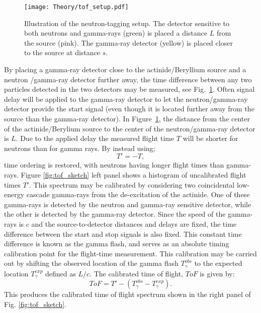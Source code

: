 \documentclass[main.tex]{subfiles}
\begin{document}
\begin{figure}[t]
    \centering
        \texttt{[image: Theory/tof\_setup.pdf]}
        \caption[Illustration of the neutron-tagging setup]{Illustration of the neutron-tagging setup. The detector sensitive to both neutrons and gamma-rays (green) is placed a distance $L$ from the source (pink). The gamma-ray detector (yellow) is placed closer to the source at distance $s$. }
    \label{fig:tof_setup} 
\end{figure}

By placing a gamma-ray detector close to the actinide/Beryllium source and a neutron /gamma-ray detector further away, the time difference between any two particles detected in the two detectors may be measured, see Fig.~\ref{fig:tof_setup}. Often signal delay will be applied to the gamma-ray detector to let the neutron/gamma-ray detector provide the start signal (even though it is located further away from the source than the gamma-ray detector).
In Figure~\ref{fig:tof_setup}, the distance from the center of the actinide/Berylium source to the center of the neutron/gamma-ray detector is $L$.  Due to the applied delay the measured flight time $T$ will be shorter for neutrons than for gamma rays. By instead using;
\begin{equation}
T'=-T,
\end{equation}
time ordering is restored, with neutrons having longer flight times than gamma-rays. Figure \ref{fig:tof_sketch} left panel shows a histogram of uncalibrated flight times $T'$. This spectrum may be calibrated by considering two coincidental low-energy cascade gamma-rays from the de-excitation of the actinide. One of these gamma-rays is detected by the neutron and gamma-ray sensitive detector, while the other is detected by the gamma-ray detector. 
Since the speed of the gamma-rays is $c$ and the source-to-detector distances and delays are fixed, the time difference between the start and stop signals is also fixed. This constant time difference is known as the gamma flash, and serves as an absolute timing calibration point for the flight-time measurement.
This calibration may be carried out by shifting the observed location of the gamma flash $T_\gamma^{obs}$ to the expected location $T_\gamma^{exp}$ defined as $L/c$. The calibrated time of flight, $ToF$ is given by:
\begin{equation}
	ToF = T' -(T_\gamma^{obs} - T_\gamma^{exp}).
	\label{eq:tof_cal}
\end{equation}
This produces the calibrated time of flight spectrum shown in the right panel of Fig. \ref{fig:tof_sketch}.
\end{document}
